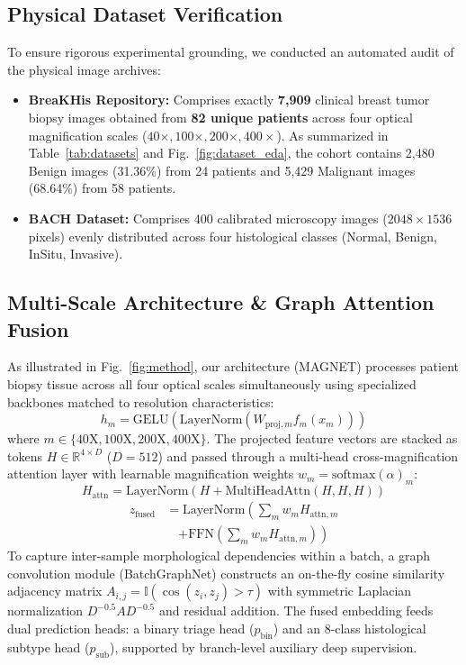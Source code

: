 \documentclass[conference]{IEEEtran}
\begin{document}
\subsection{Physical Dataset Verification}
To ensure rigorous experimental grounding, we conducted an automated audit of the physical image archives:
\begin{itemize}
    \item \textbf{BreaKHis Repository:} Comprises exactly \textbf{7,909} clinical breast tumor biopsy images obtained from \textbf{82 unique patients} across four optical magnification scales ($40\times, 100\times, 200\times, 400\times$). As summarized in Table~\ref{tab:datasets} and Fig.~\ref{fig:dataset_eda}, the cohort contains 2,480 Benign images (31.36\%) from 24 patients and 5,429 Malignant images (68.64\%) from 58 patients.
    \item \textbf{BACH Dataset:} Comprises 400 calibrated microscopy images ($2048 \times 1536$ pixels) evenly distributed across four histological classes (Normal, Benign, InSitu, Invasive).
\end{itemize}

\subsection{Multi-Scale Architecture \& Graph Attention Fusion}
As illustrated in Fig.~\ref{fig:method}, our architecture (MAGNET) processes patient biopsy tissue across all four optical scales simultaneously using specialized backbones matched to resolution characteristics:
\begin{equation}
h_{m} = \text{GELU}\left(\text{LayerNorm}\left(W_{\text{proj}, m} f_m(x_m)\right)\right)
\end{equation}
where $m \in \{40\text{X}, 100\text{X}, 200\text{X}, 400\text{X}\}$. The projected feature vectors are stacked as tokens $H \in \mathbb{R}^{4 \times D}$ ($D=512$) and passed through a multi-head cross-magnification attention layer with learnable magnification weights $w_m = \text{softmax}(\alpha)_m$:
\begin{equation}
H_{\text{attn}} = \text{LayerNorm}(H + \text{MultiHeadAttn}(H, H, H))
\end{equation}
\begin{equation}
\begin{split}
z_{\text{fused}} &= \text{LayerNorm}\left(\sum\nolimits_{m} w_m H_{\text{attn}, m} \right. \\
&\quad \left. + \text{FFN}\left(\sum\nolimits_{m} w_m H_{\text{attn}, m}\right)\right)
\end{split}
\end{equation}
To capture inter-sample morphological dependencies within a batch, a graph convolution module (BatchGraphNet) constructs an on-the-fly cosine similarity adjacency matrix $A_{i,j} = \mathbb{I}(\cos(z_i, z_j) > \tau)$ with symmetric Laplacian normalization $D^{-0.5} A D^{-0.5}$ and residual addition. The fused embedding feeds dual prediction heads: a binary triage head ($p_{\text{bin}}$) and an 8-class histological subtype head ($p_{\text{sub}}$), supported by branch-level auxiliary deep supervision.
\end{document}
